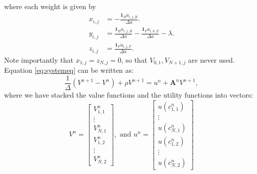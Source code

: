 \documentclass[12pt]{article}
\DeclareMathOperator{\1}{\mathbbm{1}}
\begin{document}
where each weight is given by
\begin{align*}
x_{i,j} &=  -\frac{\mathbf{1}_B \dot a_{i,j,B}}{\Delta a}. \\
y_{i,j} &=  \frac{\mathbf{1}_B \dot a_{i,j,B}}{\Delta a} -\frac{\mathbf{1}_F \dot a_{i,h,F}}{\Delta a} - \lambda. \\
z_{i,j} &= \frac{\mathbf{1}_F \dot a_{i,j,F}}{\Delta a}.
\end{align*}
Note importantly that $x_{1,j}=z_{N,j}=0$, so that $V_{0,1},V_{N+1,j}$ are never used.  Equation \eqref{eq:systemeq} can be written as:
\begin{equation}
\frac{1}{\Delta} (V^{n+1} - V^n) + \rho V^{n+1} = u^n + \mathbf{A}^nV^{n+1},
\end{equation}
where we have stacked the value functions and the utility functions into vectors:
	\begin{equation*}
	V^{n}=\begin{bmatrix}
	V^n_{1,1} \\ 
	 \vdots \\
	V^n_{N,1} \\
	V^n_{1,2} \\
	\vdots \\
	V^n_{N,2}
	\end{bmatrix}, \text{ and } u^n=\begin{bmatrix}
	u(c^n_{1,1}) \\ 
	 \vdots \\
	u(c^n_{N,1}) \\
	u(c^n_{1,2}) \\
	\vdots \\
	u(c^n_{N,2})
	\end{bmatrix}
	\end{equation*}
\end{document}
